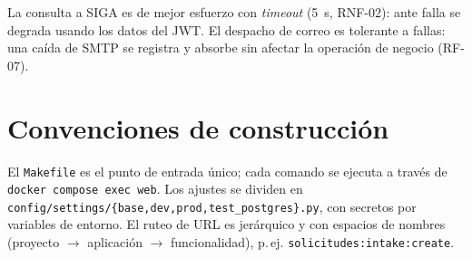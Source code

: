 \documentclass[12pt,letterpaper]{report}
\begin{document}
La consulta a SIGA es de mejor esfuerzo con \textit{timeout} (5~s, RNF-02): ante
falla se degrada usando los datos del JWT. El despacho de correo es tolerante a
fallas: una caída de SMTP se registra y absorbe sin afectar la operación de
negocio (RF-07).

\section{Convenciones de construcción}

El \texttt{Makefile} es el punto de entrada único; cada comando se ejecuta a
través de \texttt{docker compose exec web}. Los ajustes se dividen en
\texttt{config/settings/\{base,dev,prod,test\_postgres\}.py}, con secretos por
variables de entorno. El ruteo de URL es jerárquico y con espacios de nombres
(proyecto $\rightarrow$ aplicación $\rightarrow$ funcionalidad), p.\,ej.
\texttt{solicitudes:intake:create}.
\end{document}
